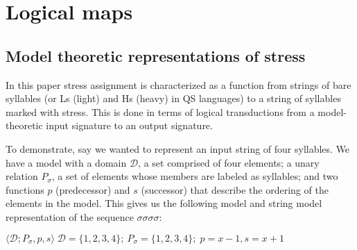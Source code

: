 \documentclass[12pt]{article}
\newcommand{\sig}{\sigma}
\begin{document}
\section{Logical maps}

\subsection{Model theoretic representations of stress}

In this paper stress assignment is characterized as a function from strings of bare syllables (or Ls (light) and Hs (heavy) in QS languages) to a string of syllables marked with stress. This is done in terms of logical transductions from a model-theoretic input signature to an output signature. 

To demonstrate, say we wanted to represent an input string of four syllables. We have a model with a domain $\mathcal{D}$, a set comprised of four elements; a unary relation $P_\sig$, a set of elements whose members are labeled as syllables; and two functions $p$ (predecessor) and $s$ (successor) that describe the ordering of the elements in the model. This gives us the following model and string model representation of the sequence $\sig\sig\sig\sig$:

\begin{exe}
\item 

 $\langle \mathcal{D}; P_\sig,p, s\rangle \; \mathcal{D}=\{1,2,3,4\}; \: P_\sig = \{1,2,3,4\}; \;p = x-1, s = x+1$ \\ 


 \label{exmodel}
\end{exe}
\end{document}
